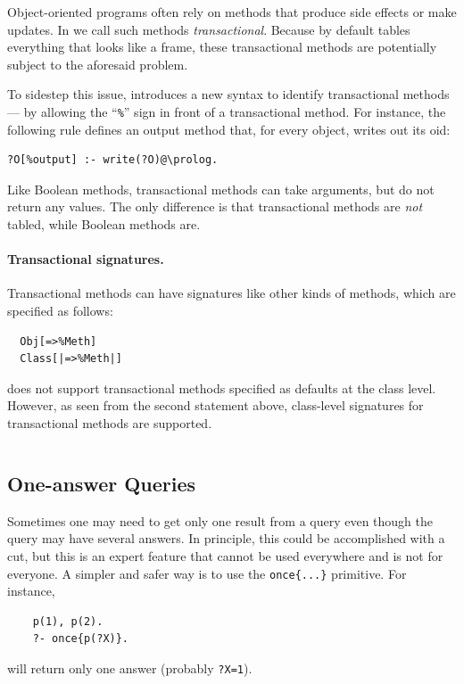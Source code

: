 \documentclass[11pt]{article}
\newcommand{\ERGO}{\mbox{\smaller{\ensuremath{\cal{E}}\smaller{{\sc{RGO}}}}}\xspace}
\newcommand{\FLSYSTEM}{\ERGO}
\begin{document}
Object-oriented programs often rely on methods that produce side effects
or make updates.  In \FLSYSTEM we call such methods 
\emph{transactional}.
Because by default \FLSYSTEM tables everything that looks like a frame,
these transactional methods are potentially subject to the aforesaid problem.

To sidestep this issue, \FLSYSTEM introduces a new syntax to identify
transactional methods --- by allowing the ``\verb|%|'' sign in front of a
transactional method. For instance, the following rule defines an output
method that, for every object, writes out its oid:
\begin{verbatim}
?O[%output] :- write(?O)@\prolog.
\end{verbatim}
Like Boolean methods, transactional methods can take arguments, but do not
return any values.  The only difference is that transactional methods are
\emph{not} tabled, while Boolean methods are.

\paragraph{Transactional signatures.}
Transactional methods can have signatures like other kinds of methods, which
are specified as follows:
\begin{verbatim}
  Obj[=>%Meth]
  Class[|=>%Meth|]
\end{verbatim}
\FLSYSTEM does not support transactional methods specified as defaults at the
class level. However, as seen from the second statement above, class-level
signatures for transactional methods are supported.
\begin{verbatim}
\end{verbatim}

\subsection{One-answer Queries}

Sometimes one may need to get only one result from a query even though the
query may have several answers. In principle, this could be accomplished
with a cut, but this is an expert feature that cannot be used everywhere
and is not for everyone.
A simpler and safer way is to use the \texttt{once\{...\}} primitive.
For instance,
\begin{verbatim}
    p(1), p(2).
    ?- once{p(?X)}.
\end{verbatim}
will return only one answer (probably \texttt{?X=1}).
\end{document}
